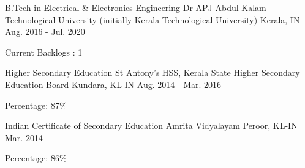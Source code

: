 

\begin{cventries}

  \cventry
    {B.Tech in Electrical \& Electronics Engineering} %
    {Dr APJ Abdul Kalam Technological University (initially Kerala Technological University)} %
    {Kerala, IN} %
    {Aug. 2016 - Jul. 2020} %
    {
      \begin{cvitems} %
        \item {Current Backlogs : 1}
      \end{cvitems}
    }

  \cventry
    {Higher Secondary Education} %
    {St Antony's HSS, Kerala State Higher Secondary Education Board} %
    {Kundara, KL-IN} %
    {Aug. 2014 - Mar. 2016} %
    {
      \begin{cvitems} %
        \item {Percentage: 87\%}
      \end{cvitems}
    }

  \cventry
    {Indian Certificate of Secondary Education} %
    {Amrita Vidyalayam} %
    {Peroor, KL-IN} %
    {Mar. 2014} %
    {
      \begin{cvitems} %
        \item {Percentage: 86\%}
      \end{cvitems}
    }

\end{cventries}
